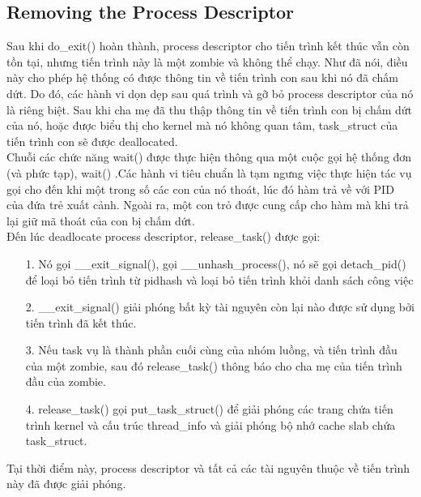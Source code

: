 \documentclass[a4paper,10pt]{report}
\begin{document}
\subsection{Removing the Process Descriptor}
Sau khi do\_exit() hoàn thành,  process descriptor cho tiến trình kết thúc vẫn còn tồn tại, nhưng tiến trình này là một zombie và không thể chạy. Như đã nói, điều này cho phép hệ thống có được thông tin về tiến trình con sau khi nó đã chấm dứt. Do đó, các hành vi dọn dẹp sau quá trình và gỡ bỏ process descriptor của nó là riêng biệt. Sau khi cha mẹ đã thu thập thông tin về tiến trình con bị chấm dứt của nó, hoặc được biểu thị cho kernel mà nó không quan tâm, task\_struct của tiến trình con sẽ được deallocated. \\

Chuỗi các chức năng wait() được thực hiện thông qua một cuộc gọi hệ thống đơn (và phức tạp), wait() .Các hành vi tiêu chuẩn là tạm ngưng việc thực hiện tác vụ gọi cho đến khi một trong số các con của nó thoát, lúc đó hàm trả về với PID của đứa trẻ xuất cảnh. Ngoài ra, một con trỏ được cung cấp cho hàm mà khi trả lại giữ mã thoát của con bị chấm dứt. \\

Đến lúc deadlocate process descriptor, release\_task() được gọi:
\begin{itemize}
\item[1. ] Nó gọi \_\_exit\_signal(), gọi \_\_unhash\_process(), nó sẽ gọi detach\_pid() để loại bỏ tiến trình từ pidhash và loại bỏ tiến trình khỏi danh sách công việc
\item[2. ] \_\_exit\_signal() giải phóng bất kỳ tài nguyên còn lại nào được sử dụng bởi tiến trình đã kết thúc.
\item[3. ] Nếu task vụ là thành phần cuối cùng của nhóm luồng, và tiến trình đầu của một zombie, sau đó release\_task() thông báo cho cha mẹ của tiến trình đầu của zombie.
\item[4. ] release\_task() gọi put\_task\_struct() để giải phóng các trang chứa tiến trình kernel và cấu trúc thread\_info và giải phóng bộ nhớ cache slab chứa task\_struct.
\end{itemize}
Tại thời điểm này, process descriptor và tất cả các tài nguyên thuộc về tiến trình này đã được giải phóng.
\end{document}
